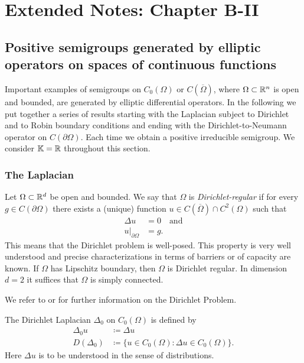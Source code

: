 \setcounter{chapter}{1}
\chapter{Extended Notes: Chapter B-II}
\label{chap:eb2}%
\section[Positive semigroups generated by elliptic operators]{Positive semigroups generated by elliptic operators on spaces of continuous functions}
Important examples of semigroups on $C_0(\Omega)$ or $C(\overline{\Omega})$, where $\Omega \subset \mathbb{R}^n$ is open and bounded, are generated by elliptic differential operators. In the following we put together a series of results starting with the Laplacian subject to Dirichlet and to Robin boundary conditions and ending with the Dirichlet-to-Neumann operator on $C(\partial\Omega)$. Each time we obtain a positive irreducible semigroup. We consider $\mathbb{K} = \mathbb{R}$ throughout this section.
\subsection{The Laplacian}
Let $\Omega \subset \mathbb{R}^d$ be open and bounded. We say that $\Omega$ is \emph{Dirichlet-regular} if for every $g \in C(\partial\Omega)$ there exists a (unique) function $u \in C(\overline{\Omega}) \cap C^2(\Omega)$ such that
\begin{align*}
 	\Delta u &= 0 \quad \text{and} \\
	u|_{\partial\Omega} &= g.
\end{align*} 
This means that the Dirichlet problem is well-posed. 
This property is very well understood and precise characterizations in terms of barriers or of capacity are known. 
If $\Omega$ has Lipschitz boundary, then $\Omega$ is Dirichlet regular. 
In dimension $d = 2$ it suffices that $\Omega$ is simply connected.

We refer to \citet[Section 6.9]{Au23}  or \citet[Section 2.8]{GT83}  for further information on the Dirichlet Problem. 

The Dirichlet Laplacian $\Delta_0$ on $C_0(\Omega)$ is defined by
\begin{align*}
 	\Delta_0 u &\coloneq \Delta u \\
 	D(\Delta_0) &\coloneq \{ u \in C_0(\Omega) \colon \Delta u \in C_0(\Omega) \}.
\end{align*}
Here $\Delta u$ is to be understood in the sense of distributions.

